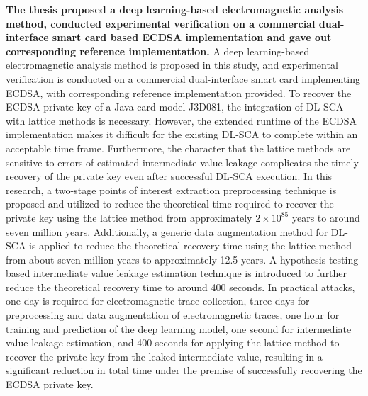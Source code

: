 \textbf{The thesis proposed a deep learning-based electromagnetic analysis method, conducted experimental verification on a commercial dual-interface smart card based ECDSA implementation and gave out corresponding reference implementation.} A deep learning-based electromagnetic analysis method is proposed in this study, and experimental verification is conducted on a commercial dual-interface smart card implementing ECDSA, with corresponding reference implementation provided. To recover the ECDSA private key of a Java card model J3D081, the integration of DL-SCA with lattice methods is necessary. However, the extended runtime of the ECDSA implementation makes it difficult for the existing DL-SCA to complete within an acceptable time frame. Furthermore, the character that the lattice methods are sensitive to errors of estimated intermediate value leakage complicates the timely recovery of the private key even after successful DL-SCA execution. In this research, a two-stage points of interest extraction preprocessing technique is proposed and utilized to reduce the theoretical time required to recover the private key using the lattice method from approximately $2 \times 10^{85}$ years to around seven million years. Additionally, a generic data augmentation method for DL-SCA is applied to reduce the theoretical recovery time using the lattice method from about seven million years to approximately 12.5 years. A hypothesis testing-based intermediate value leakage estimation technique is introduced to further reduce the theoretical recovery time to around 400 seconds. In practical attacks, one day is required for electromagnetic trace collection, three days for preprocessing and data augmentation of electromagnetic traces, one hour for training and prediction of the deep learning model, one second for intermediate value leakage estimation, and 400 seconds for applying the lattice method to recover the private key from the leaked intermediate value, resulting in a significant reduction in total time under the premise of successfully recovering the ECDSA private key.


\pagestyle{enfrontmatterstyle}%
\cleardoublepage\pagestyle{frontmatterstyle}%

